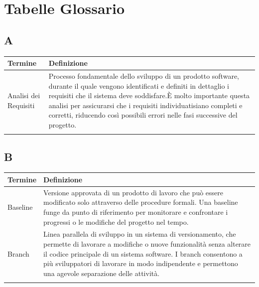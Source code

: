 \documentclass[10pt]{article}
\begin{document}
\newpage
\section{Tabelle Glossario}

\vspace{2mm}
\renewcommand{\arraystretch}{1.5} %
\setlength{\tabcolsep}{10pt} %


\subsection{A} %
\begin{tabularx}{\textwidth}{|>{\centering\arraybackslash}l|X|}
\hline
\rowcolor[gray]{0.8}
\textbf{Termine} & \textbf{Definizione}\\
\hline
Analisi dei Requisiti & Processo fondamentale dello sviluppo di un prodotto software, durante il quale vengono identificati e definiti in dettaglio i requisiti che il sistema deve soddisfare.\newline È molto importante questa analisi per assicurarsi che i requisiti individuatisiano completi e corretti, riducendo così possibili errori nelle fasi successive del progetto.\\
\hline
 & \\
\hline
\end{tabularx}

\subsection{B} %
\begin{tabularx}{\textwidth}{|>{\centering\arraybackslash}l|X|}
\hline
\rowcolor[gray]{0.8}
\textbf{Termine} & \textbf{Definizione}\\
\hline
Baseline & Versione approvata di un prodotto di lavoro che può essere modificato solo attraverso delle procedure formali. Una baseline funge da punto di riferimento per monitorare e confrontare i progressi o le modifiche del progetto nel tempo.\\
\hline
Branch & Linea parallela di sviluppo in un sistema di versionamento, che permette di lavorare a modifiche o nuove funzionalità senza alterare il codice principale di un sistema software. I branch consentono a più sviluppatori di lavorare in modo indipendente e permettono una agevole separazione delle attività.\\
\hline
 & \\
\hline
\end{tabularx}
\end{document}
